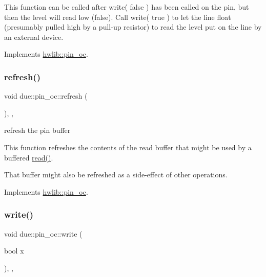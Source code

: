This function can be called after write( false ) has been called on the pin, but then the level will read low (false). Call write( true ) to let the line float (presumably pulled high by a pull-\/up resistor) to read the level put on the line by an external device. 

Implements \hyperlink{classhwlib_1_1pin__oc_a51180afd605add59b96105fa98e29f88}{hwlib\+::pin\+\_\+oc}.

\mbox{\label{classdue_1_1pin__oc_a9cda433d0079aee45a282f07efe2fee3}} 
\subsubsection{\texorpdfstring{refresh()}{refresh()}}
{\footnotesize\ttfamily void due\+::pin\+\_\+oc\+::refresh (\begin{DoxyParamCaption}{ }\end{DoxyParamCaption})\hspace{0.3cm}{\ttfamily [inline]}, {\ttfamily [override]}, {\ttfamily [virtual]}}





refresh the pin buffer

This function refreshes the contents of the read buffer that might be used by a buffered \hyperlink{classdue_1_1pin__oc_a2b9121a384b5645253b799e54417c5ca}{read()}.

That buffer might also be refreshed as a side-\/effect of other operations. 

Implements \hyperlink{classhwlib_1_1pin__oc_a573740f6f790c5792efc9cdd44cc73b3}{hwlib\+::pin\+\_\+oc}.

\mbox{\label{classdue_1_1pin__oc_ae79fc294d52d1d7c69117af5ffd81316}} 
\subsubsection{\texorpdfstring{write()}{write()}}
{\footnotesize\ttfamily void due\+::pin\+\_\+oc\+::write (\begin{DoxyParamCaption}\item[{bool}]{x }\end{DoxyParamCaption})\hspace{0.3cm}{\ttfamily [inline]}, {\ttfamily [override]}, {\ttfamily [virtual]}}





